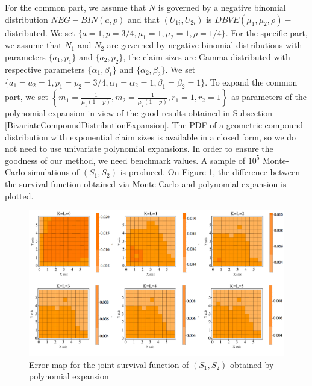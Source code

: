 For the common part, we assume that $N$ is governed by a negative binomial distribution $NEG-BIN(a,p)$ and that $(U_{1i},U_{2i}) $ is $DBVE(\mu_{1},\mu_{2},\rho)-$distributed. We set $\{a=1, p=3/4, \mu_{1}=1, \mu_{2}=1, \rho=1/4\}$. For the specific part, we assume that $N_{1}$ and $N_{2}$ are governed by negative binomial distributions with parameters $\{a_{1},p_{1}\}$ and $\{a_{2},p_{2}\}$, the claim sizes are Gamma distributed with respective parameters $\{\alpha_{1},\beta_{1}\}$ and $\{\alpha_{2},\beta_{2}\}$. We set $\{a_{1}=a_{2}=1, p_{1}=p_{2}=3/4,\alpha_{1}=\alpha_{2}=1, \beta_{1}=\beta_{2}=1\}$. To expand the common part, we set $\left\{m_{1}=\frac{1}{\mu_{1}(1-p)},m_{2}=\frac{1}{\mu_{2}(1-p)},r_{1}=1,r_{2}=1\right\}$ as parameters of the polynomial expansion in view of the good results obtained in Subsection \ref{BivariateCompoundDistributionExpansion}. The PDF of a geometric compound distribution with exponential claim sizes is available in a closed form, so we do not need to use univariate polynomial expansions. In order to ensure the goodness of our method, we need benchmark values. A sample of $10^{5}$ Monte-Carlo simulations of $(S_{1},S_{2})$ is produced. On Figure \ref{NegBinCompoundDBVE}, the difference between the survival function obtained via Monte-Carlo and polynomial expansion is plotted. 
\begin{center}
	\begin{figure}[h!]
		\begin{center}
			\includegraphics[width=14cm]{Chapitre5/GraphSurvivalFunctionAggregateClaim.png}
			\caption{Error map for the joint survival function of $(S_{1},S_{2})$ obtained by polynomial expansion}\label{NegBinCompoundDBVE}
		\end{center}
	\end{figure}
\end{center}

